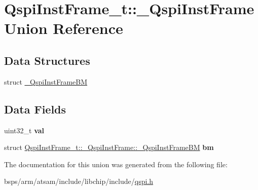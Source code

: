 \hypertarget{unionQspiInstFrame__t_1_1__QspiInstFrame}{}\section{Qspi\+Inst\+Frame\+\_\+t\+::\+\_\+\+Qspi\+Inst\+Frame Union Reference}
\label{unionQspiInstFrame__t_1_1__QspiInstFrame}
\subsection*{Data Structures}
\begin{DoxyCompactItemize}
\item 
struct \mbox{\hyperlink{structQspiInstFrame__t_1_1__QspiInstFrame_1_1__QspiInstFrameBM}{\+\_\+\+Qspi\+Inst\+Frame\+BM}}
\end{DoxyCompactItemize}
\subsection*{Data Fields}
\begin{DoxyCompactItemize}
\item 
\mbox{\label{unionQspiInstFrame__t_1_1__QspiInstFrame_a4ced6fab7f433a5f972a91c4c0c30cf4}} 
uint32\+\_\+t {\bfseries val}
\item 
\mbox{\label{unionQspiInstFrame__t_1_1__QspiInstFrame_a316bbe2dc97c2517710bea281a707d37}} 
struct \mbox{\hyperlink{structQspiInstFrame__t_1_1__QspiInstFrame_1_1__QspiInstFrameBM}{Qspi\+Inst\+Frame\+\_\+t\+::\+\_\+\+Qspi\+Inst\+Frame\+::\+\_\+\+Qspi\+Inst\+Frame\+BM}} {\bfseries bm}
\end{DoxyCompactItemize}


The documentation for this union was generated from the following file\+:\begin{DoxyCompactItemize}
\item 
bsps/arm/atsam/include/libchip/include/\mbox{\hyperlink{qspi_8h}{qspi.\+h}}\end{DoxyCompactItemize}
